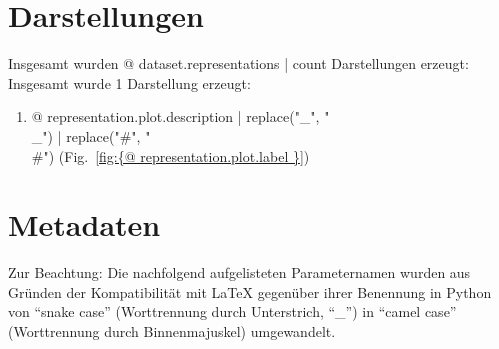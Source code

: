 



\section{Darstellungen}

Insgesamt wurden {@ dataset.representations | count } Darstellungen erzeugt:
Insgesamt wurde 1 Darstellung erzeugt:

\begin{enumerate}
\item {@ representation.plot.description | replace("_", "\\_") | replace("#", "\\#") } (Fig.~\ref{fig:{@ representation.plot.label }})
\end{enumerate}




\clearpage


\section{Metadaten}

Zur Beachtung: Die nachfolgend aufgelisteten Parameternamen wurden aus Gründen der Kompatibilität mit \LaTeX{} gegenüber ihrer Benennung in Python von \enquote{snake case} (Worttrennung durch Unterstrich, \enquote{\_}) in \enquote{camel case} (Worttrennung durch Binnenmajuskel) umgewandelt.




